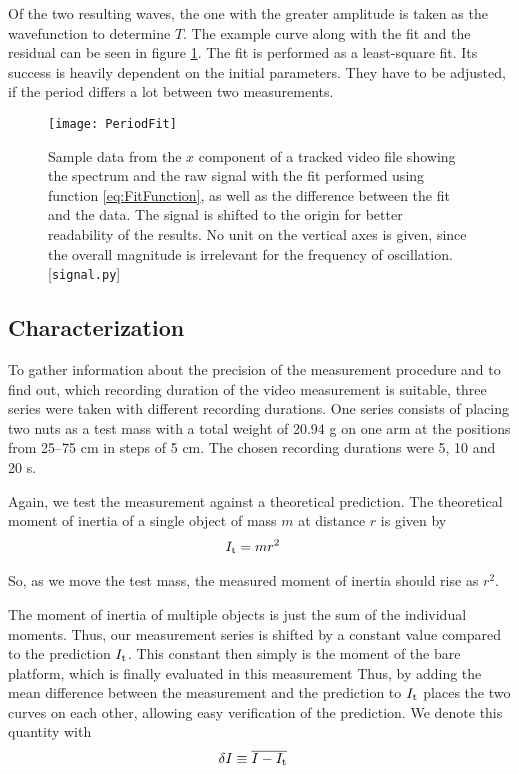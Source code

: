 \documentclass[journal]{IEEEtran}
\begin{document}
Of the two resulting waves, the one with the greater amplitude is taken as the wavefunction to determine $T$. The example curve along with the fit and the residual can be seen in figure \ref{fig:PeriodFit}.
The fit is performed as a least-square fit. Its success is heavily dependent on the initial parameters.
They have to be adjusted, if the period differs a lot between two measurements.

\begin{figure}
	\centering
	\texttt{[image: PeriodFit]}
	\caption{Sample data from the $x$ component of a tracked video file showing the spectrum and the raw signal with the fit performed using function \eqref{eq:FitFunction}, as well as the difference between the fit and the data. The signal is shifted to the origin for better readability of the results. No unit on the vertical axes is given, since the overall magnitude is irrelevant for the frequency of oscillation. [\texttt{signal.py}]}
	\label{fig:PeriodFit}
\end{figure}

\subsection{Characterization}

To gather information about the precision of the measurement procedure and to find out, which recording duration of the video measurement is suitable, three series were taken with different recording durations.
One series consists of placing two nuts as a test mass with a total weight of 20.94 g on one arm at the positions from 25--75 cm in steps of 5 cm.
The chosen recording durations were 5, 10 and 20 s.

Again, we test the measurement against a theoretical prediction.
The theoretical moment of inertia of a single object of mass $m$ at distance $r$ is given by
\begin{align} 
	I_{\textup{t}} & = m r^2
	\label{eq:It}
\end{align}

So, as we move the test mass, the measured moment of inertia should rise as $r^2$.

The moment of inertia of multiple objects is just the sum of the individual moments. Thus, our measurement series is shifted by a constant value compared to the prediction $I_{\textup{t}}$. This constant then simply is the moment of the bare platform, which is finally evaluated in this measurement
Thus, by adding the mean difference between the measurement and the prediction to $I_{\textup{t}}$ places the two curves on each other, allowing easy verification of the prediction.
We denote this quantity with
\begin{align}
	\delta I & \equiv \overline{I - I_{\textup{t}}}
	\label{eq:DeltaI}
\end{align}
\end{document}
